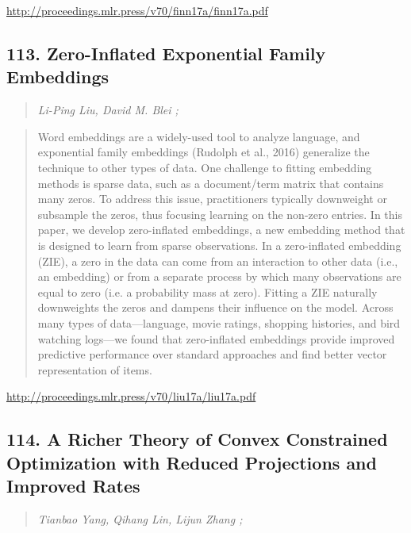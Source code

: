 \documentclass{article}
\begin{document}
\href{http://proceedings.mlr.press/v70/finn17a/finn17a.pdf}{http://proceedings.mlr.press/v70/finn17a/finn17a.pdf}

\subsection{113. Zero-Inflated Exponential Family Embeddings}

\begin{quote}
\footnotesize{\textit{Li-Ping Liu, David M. Blei ;}}
\end{quote}

\begin{quote}
    Word embeddings are a widely-used tool to analyze language, and exponential family embeddings (Rudolph et al., 2016) generalize the technique to other types of data. One challenge to fitting embedding methods is sparse data, such as a document/term matrix that contains many zeros. To address this issue, practitioners typically downweight or subsample the zeros, thus focusing learning on the non-zero entries. In this paper, we develop zero-inflated embeddings, a new embedding method that is designed to learn from sparse observations. In a zero-inflated embedding (ZIE), a zero in the data can come from an interaction to other data (i.e., an embedding) or from a separate process by which many observations are equal to zero (i.e. a probability mass at zero). Fitting a ZIE naturally downweights the zeros and dampens their influence on the model. Across many types of data—language, movie ratings, shopping histories, and bird watching logs—we found that zero-inflated embeddings provide improved predictive performance over standard approaches and find better vector representation of items.  \end{quote}

\href{http://proceedings.mlr.press/v70/liu17a/liu17a.pdf}{http://proceedings.mlr.press/v70/liu17a/liu17a.pdf}

\subsection{114. A Richer Theory of Convex Constrained Optimization with Reduced Projections and Improved Rates}

\begin{quote}
\footnotesize{\textit{Tianbao Yang, Qihang Lin, Lijun Zhang ;}}
\end{quote}
\end{document}
